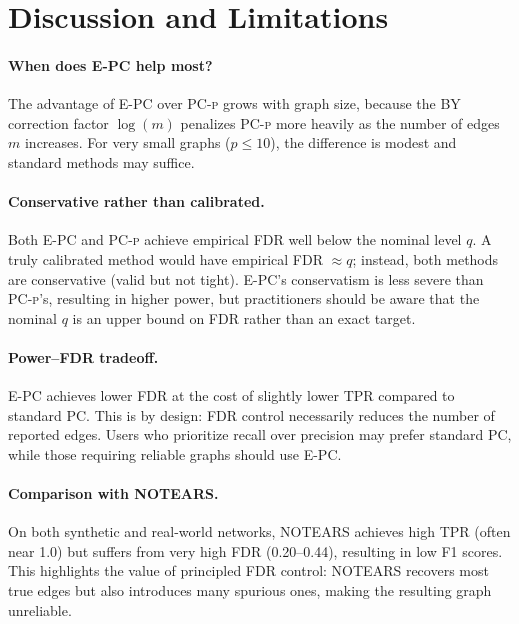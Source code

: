 \documentclass[11pt]{article}
\newcommand{\epc}{\textsc{E-PC}}
\newcommand{\pcp}{\textsc{PC-p}}
\begin{document}
\section{Discussion and Limitations}
\label{sec:discussion}

\paragraph{When does \epc{} help most?}
The advantage of \epc{} over \pcp{} grows with graph size, because the BY correction factor $\log(m)$ penalizes \pcp{} more heavily as the number of edges $m$ increases. For very small graphs ($p \leq 10$), the difference is modest and standard methods may suffice.

\paragraph{Conservative rather than calibrated.}
Both \epc{} and \pcp{} achieve empirical FDR well below the nominal level $q$. A truly calibrated method would have empirical FDR $\approx q$; instead, both methods are conservative (valid but not tight). \epc{}'s conservatism is less severe than \pcp{}'s, resulting in higher power, but practitioners should be aware that the nominal $q$ is an upper bound on FDR rather than an exact target.

\paragraph{Power--FDR tradeoff.}
\epc{} achieves lower FDR at the cost of slightly lower TPR compared to standard PC. This is by design: FDR control necessarily reduces the number of reported edges. Users who prioritize recall over precision may prefer standard PC, while those requiring reliable graphs should use \epc{}.

\paragraph{Comparison with NOTEARS.}
On both synthetic and real-world networks, NOTEARS \citep{zheng2018dags} achieves high TPR (often near 1.0) but suffers from very high FDR (0.20--0.44), resulting in low F1 scores. This highlights the value of principled FDR control: NOTEARS recovers most true edges but also introduces many spurious ones, making the resulting graph unreliable.
\end{document}
